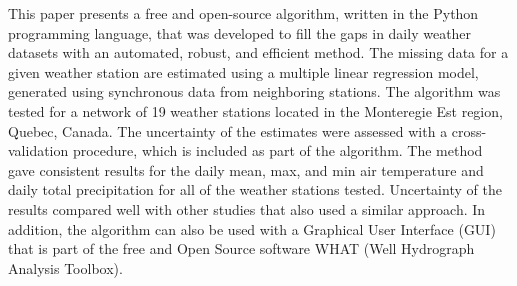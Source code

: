\documentclass[TechnicalNoteMeteo.tex]{subfiles}
\begin{document}
\noindent 

This paper presents a free and open-source algorithm, written in the Python programming language, that was developed to fill the gaps in daily weather datasets with an automated, robust, and efficient method. The missing data for a given weather station are estimated using a multiple linear regression model, generated using synchronous data from neighboring stations. The algorithm was tested for a network of 19 weather stations located in the Monteregie Est region, Quebec, Canada. The uncertainty of the estimates were assessed with a cross-validation procedure, which is included as part of the algorithm. The method gave consistent results for the daily mean, max, and min air temperature and daily total precipitation for all of the weather stations tested. Uncertainty of the results compared well with other studies that also used a similar approach. In addition, the algorithm can also be used with a Graphical User Interface (GUI) that is part of the free and Open Source software WHAT (Well Hydrograph Analysis Toolbox).  
\end{document}
